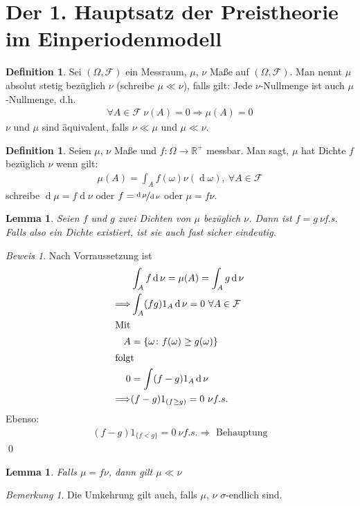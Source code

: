 \documentclass[]{scrartcl}
\numberwithin{equation}{section}
\theoremstyle{plain}
\newtheorem{lem}[satz]{Lemma}
\theoremstyle{definition}
\newtheorem{defi}[satz]{Definition}
\theoremstyle{remark}
\newtheorem*{bemerkung}{Bemerkung}
\theoremstyle{proof}
\newtheorem*{bew}{Beweis}
\newcommand{\F}{\mathcal{F}}
\newcommand{\R}{\mathbb{R}}
\renewcommand{\d}{\operatorname{d}}
\newcommand{\epm}{Einperiodenmodell}
\begin{document}
	\section{Der 1. Hauptsatz der Preistheorie im \epm}
	\begin{defi}
		Sei $(\Omega,\F)$ ein Messraum, $\mu$, $\nu$ Maße auf $(\Omega,\F)$. Man nennt $\mu$ absolut stetig bezüglich $\nu$ (schreibe $\mu\ll\nu$), falls gilt: Jede $\nu$-Nullmenge ist auch $\mu$-Nullmenge, d.h.\begin{align*}
			\forall A\in\F\ \nu(A)=0\Rightarrow\mu(A)=0
		\end{align*}
		$\nu$ und $\mu$ sind äquivalent, falls $\nu\ll\mu$ und $\mu\ll\nu$.
	\end{defi}
	\begin{defi}
		Seien $\mu$, $\nu$ Maße und $f\colon\Omega\to\R^+$ messbar. Man sagt, $\mu$ hat Dichte $f$ bezüglich $\nu$ wenn gilt:
		\begin{align*}
			\mu(A)=\int_Af(\omega)\nu(\operatorname{d}\omega),\ \forall A\in\F 
		\end{align*}
		schreibe $\d\mu=f\d\nu$ oder $f=\nicefrac{\d\mu}{\d\nu}$ oder $\mu=f\nu$.
	\end{defi}
	\begin{lem}
		Seien $f$ und $g$ zwei Dichten von $\mu$ bezüglich $\nu$. Dann ist $f=g\ \nu$f.s. Falls also ein Dichte existiert, ist sie auch fast sicher eindeutig.
	\end{lem}
	\begin{bew}
		Nach Vorraussetzung ist 
		\begin{align*}
			&\int_Af\d\nu=\mu(A)=\int_Ag\d \nu\\
			\Longrightarrow&\int_A(fg)1_A\d\nu=0\ \forall A\in\F\\
			\intertext{Mit}
			A&=\{\omega\colon f(\omega)\ge g(\omega)\}\\
			\intertext{folgt}
			0&=\int(f-g)1_A\d\nu\\
			\Longrightarrow&(f-g)1_{(f\ge g)}=0\ \nu f.s.
		\end{align*}
		Ebenso:
		\begin{align*}
			(f-g)1_{\{f<g \}}=0\ \nu f.s. \Longrightarrow \text{ Behauptung}
		\end{align*}
		\qed
	\end{bew}
	\begin{lem}
		Falls $\mu=f\nu$, dann gilt $\mu\ll\nu$
	\end{lem}
	\begin{bemerkung}
		Die Umkehrung gilt auch, falls $\mu$, $\nu$  $\sigma$-endlich sind.
	\end{bemerkung}
\end{document}
